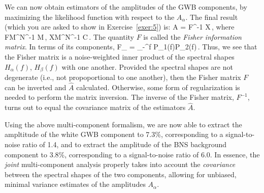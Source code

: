 We can now obtain estimators of the amplitudes of the 
GWB components, by maximizing the likelihood function 
with respect to the $A_\alpha$.
The final result (which you are asked to show in 
Exercise~\ref{exer:5}) is: 
%
\be
\hat A = F^{-1} X\,,
\ee
%
where
%
\be
F\equiv M^\dagger N^{-1} M\,,
\qquad 
X\equiv M^\dagger N^{-1} \hat C\,.
\ee
%
The quantity $F$ is called the 
{\em Fisher information matrix}.
In terms of its components,
%
\be
F_{\alpha\beta} = \int_{-\infty}^\infty \D f\> 
{P_1(f)P_2(f)}\,.
\ee
%
Thus, we see that the Fisher matrix is a noise-weighted 
inner product 
of the spectral shapes $H_\alpha(f)$, $H_\beta(f)$ with one 
another.
Provided the spectral shapes are not degenerate (i.e., not 
propoportional to one another), then the Fisher matrix $F$
can be inverted and $\hat A$ calculated.
Otherwise, some form of regularization is needed to 
perform the matrix inversion.
The inverse of the Fisher matrix, $F^{-1}$, turns out to
equal the covariance matrix of the estimators $\hat A$.  

Using the above multi-component formalism, we are now able 
to extract the ampltitude of the white GWB component to 7.3\%, 
corresponding to a signal-to-noise ratio of 1.4, 
and to extract
the amplitude of the BNS background component to 3.8\%,
corresponding to a signal-to-noise ratio of 6.0.
In essence, the {\em joint} multi-component analysis 
properly takes into account the {\em covariance}
between the spectral shapes of the two components, 
allowing for unbiased, minimal variance estimates of 
the amplitudes $A_\alpha$.

